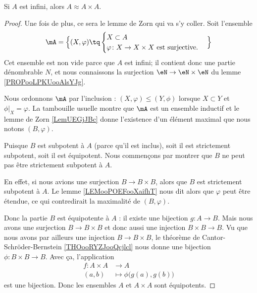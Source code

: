 \begin{theorem}     \label{THOooDGOVooRdURVi}
	Si \( A\) est infini, alors \( A\approx A\times A\).
\end{theorem}

\begin{proof}
	Une fois de plus, ce sera le lemme de Zorn qui va s'y coller. Soit l'ensemble
	\begin{equation}
		\mA=\Big\{  (X,\varphi)  \tq
		\begin{cases}
			X\subset A \\
			\varphi\colon X\to X\times X\text{ est surjective.}
		\end{cases}
		\Big\}
	\end{equation}
	Cet ensemble est non vide parce que \( A\) est infini; il contient donc une partie dénombrable \( N\), et nous connaissons la surjection \( \eN\to \eN\times \eN\) du lemme \ref{PROPooLPKUooAlsYJg}.

	Nous ordonnons \( \mA\) par l'inclusion : \( (X,\varphi)\leq (Y,\phi)\) lorsque \( X\subset Y\) et \( \phi|_X=\varphi\). La tambouille usuelle montre que \( \mA\) est un ensemble inductif et le lemme de Zorn \ref{LemUEGjJBc} donne l'existence d'un élément maximal que nous notons \( (B,\varphi)\).

	Puisque \( B\) est subpotent à \( A\) (parce qu'il est inclus), soit il est strictement subpotent, soit il est équipotent. Nous commençons par montrer que \( B\) ne peut pas être strictement subpotent à \( A\).

	En effet, si nous avions une surjection \( B\to B\times B\), alors que \( B\) est strictement subpotent à \( A\). Le lemme \ref{LEMooPOEFooXaifhT} nous dit alors que \( \varphi\) peut être étendue, ce qui contredirait la maximalité de \( (B,\varphi)\).

	Donc la partie \( B\) est équipotente à \( A\) : il existe une bijection \( g\colon A\to B\). Mais nous avons une surjection \( B\to B\times B\) et donc aussi une injection \( B\times B\to B\). Vu que nous avons par ailleurs une injection \( B\to B\times B\), le théorème de Cantor-Schröder-Bernstein \ref{THOooRYZJooQcjlcl} nous donne une bijection \( \phi\colon B\times B\to B\). Avec ça, l'application
	\begin{equation}
		\begin{aligned}
			f\colon A\times A & \to A                             \\
			(a,b)             & \mapsto \phi\big( g(a),g(b) \big)
		\end{aligned}
	\end{equation}
	est une bijection. Donc les ensembles \( A\) et \( A\times A\) sont équipotents.
\end{proof}

